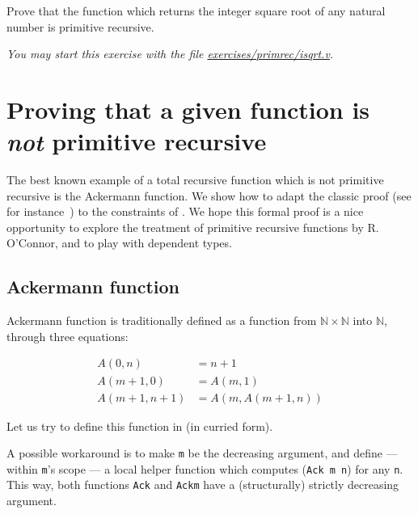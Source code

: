
\begin{exercise}
Prove that the function which returns the  integer square root of any natural number  is primitive recursive.

\emph{You may start this exercise with the file
    \href{https://github.com/coq-community/hydra-battles/blob/master/exercises/primrec/isqrt.v}{exercises/primrec/isqrt.v}.}

\end{exercise}

\section{Proving that a given function is \emph{not} primitive recursive}
\label{sect:ack-not-PR}

The best known example of a total recursive function which is not primitive recursive is the Ackermann function. We show how to adapt the classic proof (see for instance~\cite{planetmath}) to the constraints of \gallina. We hope this formal proof 
 is a nice opportunity to explore
the treatment of primitive recursive functions by R. O'Connor,
and to play with dependent types.

\subsection{Ackermann function}

Ackermann function is traditionally defined as a function from 
$\mathbb{N}\times \mathbb{N}$ into $\mathbb{N}$, through
three equations:

\begin{align*}
A(0,n)&=n+1\\
A(m+1,0)&=A(m,1)\\
A(m+1,n+1)&=A(m,A(m+1,n))
\end{align*}

Let us try to define this function in \coq{} (in curried form).



A possible workaround is to make \texttt{m} be the 
decreasing argument, and define --- within \texttt{m}'s scope --- a local helper function which computes (\texttt{Ack m n}) for any \texttt{n}.
This way, both functions \texttt{Ack} and \texttt{Ackm} have a (structurally) strictly decreasing argument.



